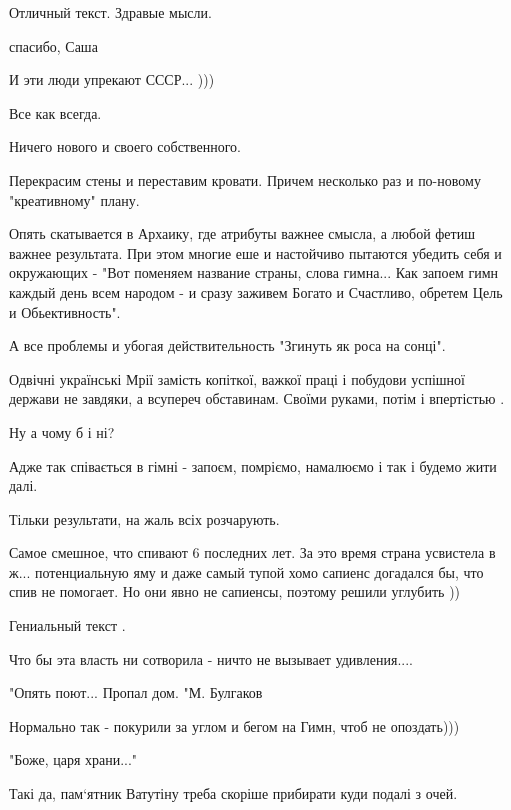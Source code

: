 \begin{itemize}
Отличный текст. Здравые мысли.

\begin{itemize} %
спасибо, Саша
\end{itemize} %


И эти люди упрекают СССР... )))


Все как всегда.

Ничего нового и своего собственного.

Перекрасим стены и переставим кровати. Причем несколько раз и по-новому
"креативному" плану.

Опять скатывается в Архаику, где атрибуты важнее смысла, а любой фетиш важнее
результата. При этом многие еше и настойчиво пытаются убедить себя и окружающих
- "Вот поменяем название страны, слова гимна... Как запоем гимн каждый день
всем народом - и сразу заживем Богато и Счастливо, обретем Цель и
Обьективность".

А все проблемы и убогая действительность "Згинуть як роса на сонці".

Одвічні українські Мрії замість копіткої, важкої праці і побудови успішної
держави не завдяки, а всупереч обставинам. Своїми руками, потім і впертістью .

Ну а чому б і ні?

Адже так співається в гімні - запоєм, помріємо, намалюємо і так і будемо жити
далі.

Тільки результати, на жаль всіх розчарують.


Самое смешное, что спивают 6 последних лет. За это время страна усвистела в
ж... потенциальную яму и даже самый тупой хомо сапиенс догадался бы, что спив
не помогает. Но они явно не сапиенсы, поэтому решили углубить ))

Гениальный текст .

Что бы эта власть ни сотворила - ничто не вызывает удивления....

"Опять поют... Пропал дом. "М. Булгаков

Нормально так - покурили за углом и бегом на Гимн, чтоб не опоздать)))

"Боже, царя храни..."

Такі да, пам‘ятник Ватутіну треба скоріше прибирати куди подалі з очей.


\end{itemize}
